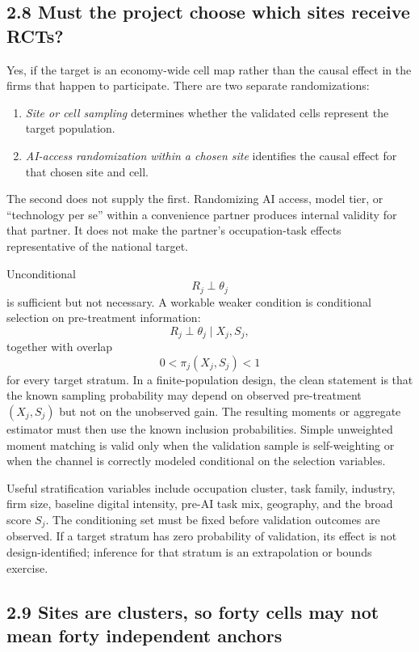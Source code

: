 \documentclass[11pt]{article}
\begin{document}
\subsection*{2.8 Must the project choose which sites receive RCTs?}

Yes, if the target is an economy-wide cell map rather than the causal effect in
the firms that happen to participate. There are two separate randomizations:
\begin{enumerate}[leftmargin=2em]
    \item \emph{Site or cell sampling} determines whether the validated cells
    represent the target population.
    \item \emph{AI-access randomization within a chosen site} identifies the
    causal effect for that chosen site and cell.
\end{enumerate}
The second does not supply the first. Randomizing AI access, model tier, or
``technology per se'' within a convenience partner produces internal validity
for that partner. It does not make the partner's occupation-task effects
representative of the national target.

Unconditional
\[
    R_j\perp\theta_j
\]
is sufficient but not necessary. A workable weaker condition is conditional
selection on pre-treatment information:
\[
    R_j\perp\theta_j
    \mid
    X_j,S_j,
\]
together with overlap
\[
    0<\pi_j(X_j,S_j)<1
\]
for every target stratum. In a finite-population design, the clean statement
is that the known sampling probability may depend on observed pre-treatment
\((X_j,S_j)\) but not on the unobserved gain. The resulting moments or
aggregate estimator must then use the known inclusion probabilities. Simple
unweighted moment matching is valid only when the validation sample is
self-weighting or when the channel is correctly modeled conditional on the
selection variables.

Useful stratification variables include occupation cluster, task family,
industry, firm size, baseline digital intensity, pre-AI task mix, geography,
and the broad score \(S_j\). The conditioning set must be fixed before
validation outcomes are observed. If a target stratum has zero probability of
validation, its effect is not design-identified; inference for that stratum is
an extrapolation or bounds exercise.

\subsection*{2.9 Sites are clusters, so forty cells may not mean forty
independent anchors}
\end{document}
